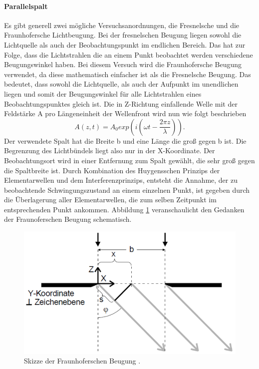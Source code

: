 \paragraph{Parallelspalt}
Es gibt generell zwei mögliche Versuchsanordnungen, die Fresnelsche und die Fraunhofersche Lichtbeugung.
Bei der fresnelschen Beugung liegen sowohl die Lichtquelle als auch der Beobachtungspunkt im endlichen Bereich. 
Das hat zur Folge, dass die Lichtstrahlen die an einem Punkt beobachtet werden verschiedene Beugungswinkel haben.
Bei diesem Versuch wird die Fraunhofersche Beugung verwendet, da diese mathematisch einfacher ist als die
Fresnelsche Beugung. Das bedeutet, dass sowohl die Lichtquelle, als auch der Aufpunkt im unendlichen liegen und somit der 
Beugungswinkel für alle Lichtstrahlen eines Beobachtungspunktes gleich ist. 
Die in Z-Richtung einfallende Welle mit der Feldstärke A pro Längeneinheit der Wellenfront wird nun wie folgt beschrieben
\begin{equation}
    \label{eq:1}
    A(z,t) = A_0 exp \left( i(\omega t - \frac{2 \pi z}{\lambda})\right).
\end{equation}
Der verwendete Spalt hat die Breite b und eine Länge die groß gegen b ist. Die Begrenzung des Lichtbündels 
liegt also nur in der X-Koordinate. Der Beobachtungsort wird in einer Entfernung zum Spalt gewählt, die sehr groß 
gegen die Spaltbreite ist.
Durch Kombination des Huygensschen Prinzips der Elementarwellen und dem Interferenzprinzips, entsteht die Annahme, 
der zu beobachtende Schwingungszustand an einem einzelnen Punkt, ist gegeben durch die Überlagerung 
aller Elementarwellen, die zum selben Zeitpunkt im entsprechenden Punkt ankommen.
Abbildung \ref{fig:a} veranschaulicht den Gedanken der Fraunoferschen Beugung schematisch.
\begin{figure}[H]
    \centering
    \includegraphics{Spalt.png}
    \caption{Skizze der Fraunhoferschen Beugung \cite{V406}.}
    \label{fig:a}
\end{figure}
